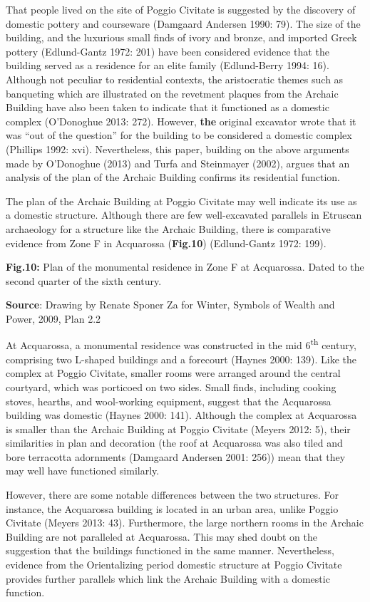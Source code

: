 That people lived on the site of Poggio Civitate is suggested by the
discovery of domestic pottery and courseware (Damgaard Andersen 1990:
79). The size of the building, and the luxurious small finds of ivory
and bronze, and imported Greek pottery (Edlund-Gantz 1972: 201) have
been considered evidence that the building served as a residence for an
elite family (Edlund-Berry 1994: 16). Although not peculiar to
residential contexts, the aristocratic themes such as banqueting which
are illustrated on the revetment plaques from the Archaic Building have
also been taken to indicate that it functioned as a domestic complex
(O'Donoghue 2013: 272). However, \textbf{the} original excavator wrote
that it was ``out of the question'' for the building to be considered a
domestic complex (Phillips 1992: xvi). Nevertheless, this paper,
building on the above arguments made by O'Donoghue (2013) and Turfa and
Steinmayer (2002), argues that an analysis of the plan of the Archaic
Building confirms its residential function.

The plan of the Archaic Building at Poggio Civitate may well indicate
its use as a domestic structure. Although there are few well-excavated
parallels in Etruscan archaeology for a structure like the Archaic
Building, there is comparative evidence from Zone F in Acquarossa
(\textbf{Fig.10}) (Edlund-Gantz 1972: 199).

\textbf{Fig.10:} Plan of the monumental residence in Zone F at
Acquarossa. Dated to the second quarter of the sixth century.

\textbf{Source}: Drawing by Renate Sponer Za for Winter, Symbols of
Wealth and Power, 2009, Plan 2.2

At Acquarossa, a monumental residence was constructed in the mid
6\textsuperscript{th} century, comprising two L-shaped buildings and a
forecourt (Haynes 2000: 139). Like the complex at Poggio Civitate,
smaller rooms were arranged around the central courtyard, which was
porticoed on two sides. Small finds, including cooking stoves, hearths,
and wool-working equipment, suggest that the Acquarossa building was
domestic (Haynes 2000: 141). Although the complex at Acquarossa is
smaller than the Archaic Building at Poggio Civitate (Meyers 2012: 5),
their similarities in plan and decoration (the roof at Acquarossa was
also tiled and bore terracotta adornments (Damgaard Andersen 2001: 256))
mean that they may well have functioned similarly.

However, there are some notable differences between the two structures.
For instance, the Acquarossa building is located in an urban area,
unlike Poggio Civitate (Meyers 2013: 43). Furthermore, the large
northern rooms in the Archaic Building are not paralleled at Acquarossa.
This may shed doubt on the suggestion that the buildings functioned in
the same manner. Nevertheless, evidence from the Orientalizing period
domestic structure at Poggio Civitate provides further parallels which
link the Archaic Building with a domestic function.

